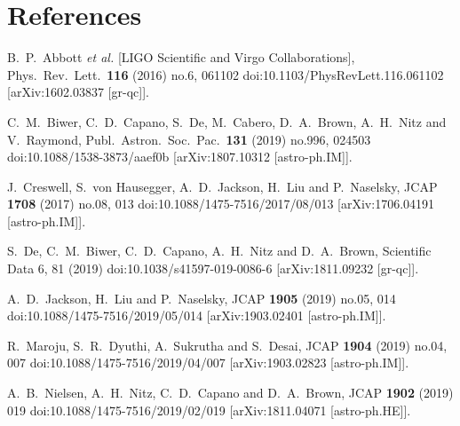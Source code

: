 \documentclass[a4paper,11pt]{article}
\begin{document}
\section{References}
\begin{thebibliography}{9}

  B.~P.~Abbott {\it et al.} [LIGO Scientific and Virgo Collaborations],
  Phys.\ Rev.\ Lett.\  {\bf 116} (2016) no.6,  061102
  doi:10.1103/PhysRevLett.116.061102
  [arXiv:1602.03837 [gr-qc]].

  C.~M.~Biwer, C.~D.~Capano, S.~De, M.~Cabero, D.~A.~Brown, A.~H.~Nitz and V.~Raymond,
  Publ.\ Astron.\ Soc.\ Pac.\  {\bf 131} (2019) no.996,  024503
  doi:10.1088/1538-3873/aaef0b
  [arXiv:1807.10312 [astro-ph.IM]].

  J.~Creswell, S.~von Hausegger, A.~D.~Jackson, H.~Liu and P.~Naselsky,
  JCAP {\bf 1708} (2017) no.08,  013
  doi:10.1088/1475-7516/2017/08/013
  [arXiv:1706.04191 [astro-ph.IM]].

  S.~De, C.~M.~Biwer, C.~D.~Capano, A.~H.~Nitz and D.~A.~Brown,
  Scientific Data 6, 81 (2019)
  doi:10.1038/s41597-019-0086-6
  [arXiv:1811.09232 [gr-qc]].

  A.~D.~Jackson, H.~Liu and P.~Naselsky,
  JCAP {\bf 1905} (2019) no.05,  014
  doi:10.1088/1475-7516/2019/05/014
  [arXiv:1903.02401 [astro-ph.IM]].

  R.~Maroju, S.~R.~Dyuthi, A.~Sukrutha and S.~Desai,
  JCAP {\bf 1904} (2019) no.04,  007
  doi:10.1088/1475-7516/2019/04/007
  [arXiv:1903.02823 [astro-ph.IM]].

  A.~B.~Nielsen, A.~H.~Nitz, C.~D.~Capano and D.~A.~Brown,
  JCAP {\bf 1902} (2019) 019
  doi:10.1088/1475-7516/2019/02/019
  [arXiv:1811.04071 [astro-ph.HE]].
  

\end{thebibliography}
\end{document}
